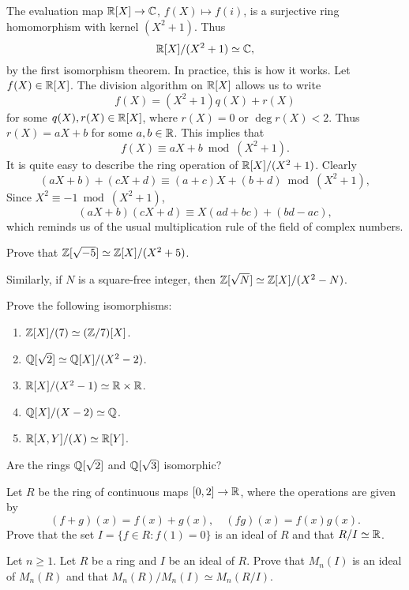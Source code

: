 \begin{example}
    The evaluation map $\mathbb{R}[X]\to\mathbb{C}$, $f(X)\mapsto f(i)$, is a surjective ring
	homomorphism with kernel $(X^2+1)$. Thus 
	\[
	\mathbb{R}[X]/(X^2+1)\simeq\mathbb{C},
	\]
	by the first isomorphism theorem. In practice, this is how it works. Let $f(X)\in\mathbb{R}[X]$. 
	The division algorithm on $\mathbb{R}[X]$ allows us to write
	\[
	f(X)=(X^2+1)q(X)+r(X)
	\]
	for some $q(X),r(X)\in\mathbb{R}[X]$, where $r(X)=0$ or $\deg r(X)<2$. Thus
	$r(X)=aX+b$ for some $a,b\in\mathbb{R}$. This implies that
	\[
	f(X)\equiv aX+b\bmod (X^2+1).
	\] 
	It is quite easy to describe the ring operation of 
	$\mathbb{R}[X]/(X^2+1)$. Clearly 
	\[
	(aX+b)+(cX+d)\equiv (a+c)X+(b+d)\bmod (X^2+1),
	\]
	Since $X^2\equiv -1\bmod (X^2+1)$,   	
	\[
	(aX+b)(cX+d)\equiv X(ad+bc)+(bd-ac), 
	\]
	which reminds us of the usual 
	multiplication rule of the field of complex numbers. 
\end{example}

\begin{exercise}
	Prove that $\mathbb{Z}[\sqrt{-5}]\simeq\mathbb{Z}[X]/(X^2+5)$. 	
\end{exercise}

Similarly, if $N$ is a square-free integer, then 
$\mathbb{Z}[\sqrt{N}]\simeq\mathbb{Z}[X]/(X^2-N)$. 

\begin{exercise}
Prove the following isomorphisms:
\begin{enumerate}
	\item $\mathbb{Z}[X]/(7)\simeq (\mathbb{Z}/7)[X]$.
	\item $\mathbb{Q}[\sqrt{2}]\simeq\mathbb{Q}[X]/(X^2-2)$.
	\item $\mathbb{R}[X]/(X^2-1)\simeq\mathbb{R}\times\mathbb{R}$.
	\item $\mathbb{Q}[X]/(X-2)\simeq\mathbb{Q}$.
	\item $\mathbb{R}[X,Y]/(X)\simeq\mathbb{R}[Y]$. 
\end{enumerate}
\end{exercise}

\begin{exercise}
	Are the rings $\mathbb{Q}[\sqrt{2}]$ and $\mathbb{Q}[\sqrt{3}]$ isomorphic?	
\end{exercise}

\begin{exercise}
	Let $R$ be the ring of continuous maps $[0,2]\to\mathbb{R}$, where the operations are given by 
	\[
	(f+g)(x)=f(x)+g(x),\quad
	(fg)(x)=f(x)g(x).
	\]
	Prove that the set 
	$I=\{f\in R:f(1)=0\}$ is an ideal of $R$ and that $R/I\simeq\mathbb{R}$.   	
\end{exercise}

\begin{exercise}
	Let $n\geq1$. 
	Let $R$ be a ring and $I$ be an ideal of $R$. Prove that $M_n(I)$ is an ideal 
	of $M_n(R)$ and that $M_n(R)/M_n(I)\simeq M_n(R/I)$. 	
\end{exercise}

